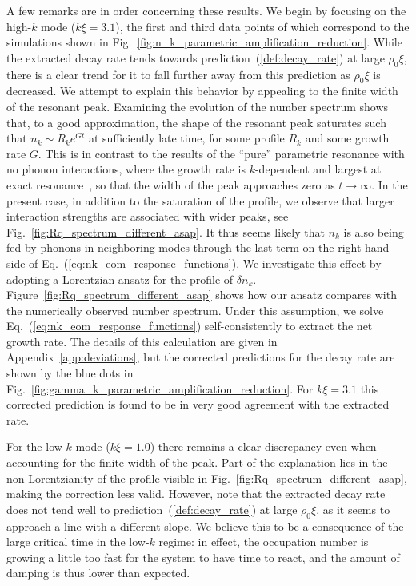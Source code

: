 \documentclass[aps,prd,notitlepage,amsfonts,amssymb,amsmath,nofootinbib,superscriptaddress,longbibliography]{revtex4-2}
\begin{document}
A few remarks are in order concerning these results.  We begin by focusing on the high-$k$ mode ($k\xi = 3.1$), the first and third data points of which correspond to the simulations shown in Fig.~\ref{fig:n_k_parametric_amplification_reduction}.
While the extracted decay rate tends towards prediction~(\ref{def:decay_rate}) at large $\rho_0 \xi$, there is a clear trend for it to fall further away from this prediction as $\rho_0 \xi$ is decreased. We attempt to explain this behavior by appealing to the finite width of the resonant peak.
Examining the evolution of the number spectrum shows that, to a good approximation, the shape of the resonant peak saturates such that $n_{k} \sim R_{k} e^{G t}$ at sufficiently late time, for some profile $R_{k}$ and some growth rate $G$.  This is in contrast to the results of the ``pure'' parametric resonance with no phonon interactions, where the growth rate is $k$-dependent and largest at exact resonance~\cite{Busch-2014}, so that the width of the peak approaches zero as $t \to \infty$.  In the present case, in addition to the saturation of the profile, we observe that larger interaction strengths are associated with wider peaks, see Fig.~\ref{fig:Rq_spectrum_different_asap}.  It thus seems likely that $n_{k}$ is also being fed by phonons in neighboring modes through the last term on the right-hand side of Eq.~(\ref{eq:nk_eom_response_functions}). We investigate this effect by adopting a Lorentzian ansatz for the profile of $\delta n_{k}$. Figure~\ref{fig:Rq_spectrum_different_asap} shows how our ansatz compares with the numerically observed number spectrum. Under this assumption, we solve Eq.~(\ref{eq:nk_eom_response_functions}) self-consistently to extract the net growth rate.  The details of this calculation are given in Appendix~\ref{app:deviations}, but the corrected predictions for the decay rate are shown by the blue dots in Fig.~\ref{fig:gamma_k_parametric_amplification_reduction}. For $k \xi = 3.1$ this corrected prediction is found to be in very good agreement with the extracted rate.

For the low-$k$ mode ($k \xi = 1.0$) there remains a clear discrepancy even when accounting for the finite width of the peak. Part of the explanation lies in the non-Lorentzianity of the profile visible in Fig.~\ref{fig:Rq_spectrum_different_asap}, making the correction less valid.  However, note that the extracted decay rate does not tend well to prediction~(\ref{def:decay_rate}) at large $\rho_{0}\xi$, as it seems to approach a line with a different slope.  We believe this to be a consequence of the large critical time in the low-$k$ regime: in effect, the occupation number is growing a little too fast for the system to have time to react, and the amount of damping is thus lower than expected.
\end{document}
